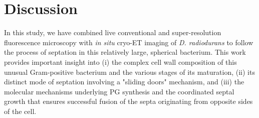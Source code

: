 \FloatBarrier

\section{Discussion}\label{ftsz_discussion}

In this study, we have combined live conventional and super-resolution fluorescence microscopy with \textit{in situ} cryo-ET imaging of \textit{D. radiodurans} to follow the process of septation in this relatively large, spherical bacterium.
This work provides important insight into (i) the complex cell wall composition of this unusual Gram-positive bacterium and the various stages of its maturation, (ii) its distinct mode of septation involving a "sliding doors" mechanism, and (iii) the molecular mechanisms underlying PG synthesis and the coordinated septal growth that ensures successful fusion of the septa originating from opposite sides of the cell.

